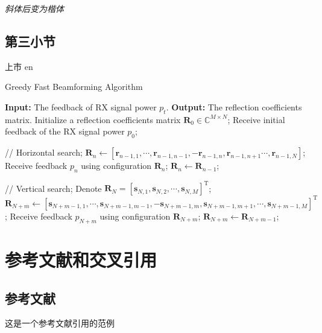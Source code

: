 \documentclass[supercite]{HustGraduPaper}
\begin{document}
{\itshape 斜体后变为楷体}

\subsection{第三小节}


上市
en
\begin{algorithm}
	\caption{Greedy Fast Beamforming Algorithm}
	\label{alg:GreedyAlgorithm}
	\begin{algorithmic}[1]
		\STATE \textbf{Input: } The feedback of RX signal power $p_t$.
		\STATE \textbf{Output: } The reflection coefficients matrix.
		\STATE Initialize a reflection coefficients matrix $ \mathbf{R}_0\in \mathbb{C}^{M \times N }$;
		\STATE Receive initial feedback of the RX signal power $ p_0 $;

		\STATE // Horizontal search;
		\STATE  $ \mathbf{R}_{n} \leftarrow [\mathbf{r}_{n-1,1},\cdots,\mathbf{r}_{n-1,n-1},- \mathbf{r}_{n-1,n}, \mathbf{r}_{n-1,n+1}\cdots,\mathbf{r}_{n-1,N}] $;
		\STATE Receive feedback $ p_{n} $ using configuration $ \mathbf{R}_{n}$;
		\STATE $ \mathbf{R}_{n} \leftarrow \mathbf{R}_{n-1}$;
		\ENDIF
		\ENDFOR

		\STATE // Vertical search;
		\STATE Denote $ \mathbf{R}_{N} =[\mathbf{s}_{N,1},\mathbf{s}_{N,2},\cdots,\mathbf{s}_{N,M}]^\mathrm{T}$;
		\small
		\STATE  $\mathbf{R}_{N+m} \leftarrow [\mathbf{s}_{N+m-1,1},\cdots,\mathbf{s}_{N+m-1,m-1},- \mathbf{s}_{N+m-1,m}, \mathbf{s}_{N+m-1,m+1}, \cdots, \mathbf{s}_{N+m-1,M}]^\mathrm{T}$;
		\normalsize
		\STATE Receive feedback $ p_{N+m} $ using configuration $\mathbf{R}_{N+m}$;
		\STATE $ \mathbf{R}_{N+m} \leftarrow \mathbf{R}_{N+m-1}$;
		\ENDIF
		\ENDFOR
	\end{algorithmic}
\end{algorithm}









\section{参考文献和交叉引用}\label{sec:ref}
\subsection{参考文献}
这是一个参考文献引用的范例\cite{9326394, Renzo2019,5502350, liang2019large, CHN_zhou2020, CHN_zhang2017}
\end{document}
